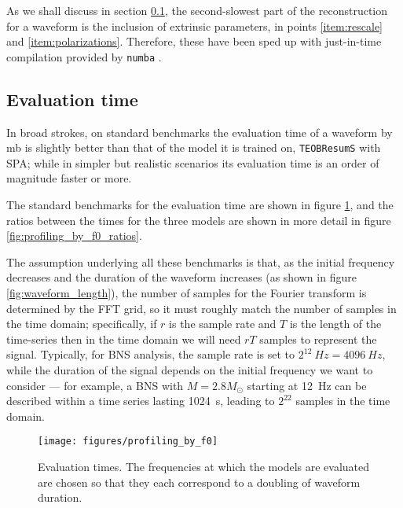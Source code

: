 \documentclass[main.tex]{subfiles}
\begin{document}
As we shall discuss in section \ref{sec:evaluation-time}, the second-slowest part of the reconstruction for a waveform is the inclusion of extrinsic parameters, in points \ref{item:rescale} and \ref{item:polarizations}. 
Therefore, these have been sped up with just-in-time compilation provided by \texttt{numba} \cite{lamNumbaLLVMbasedPython2015}.

\subsection{Evaluation time} \label{sec:evaluation-time}

In broad strokes, on standard benchmarks the evaluation time of a waveform by \ac{mb} is slightly better than that of the model it is trained on, \texttt{TEOBResumS} with \ac{SPA}; while in simpler but realistic scenarios its evaluation time is an order of magnitude faster or more.

The standard benchmarks for the evaluation time are shown in figure \ref{fig:profiling_by_f0}, and the ratios between the times for the three models are shown in more detail in figure \ref{fig:profiling_by_f0_ratios}. 

The assumption underlying all these benchmarks is that, as the initial frequency decreases and the duration of the waveform increases (as shown in figure \ref{fig:waveform_length}), the number of samples for the Fourier transform is determined by the \ac{FFT} grid, so it must roughly match the number of samples in the time domain; specifically, if \(r\) is the sample rate and \(T\) is the length of the time-series then in the time domain we will need \(rT\) samples to represent the signal. 
Typically, for \ac{BNS} analysis, the sample rate is set to \(2^{12} \SI{}{Hz} = \SI{4096}{Hz}\), while the duration of the signal depends on the initial frequency we want to consider --- for example, a \ac{BNS} with \(M = 2.8 M_{\odot}\) starting at \SI{12}{Hz} can be described within a time series lasting \SI{1024}{s}, leading to \(2^{22}\) samples in the time domain.


\begin{figure}[ht]
\centering
\texttt{[image: figures/profiling\_by\_f0]}
\caption{Evaluation times. The frequencies at which the models are evaluated are chosen so that they each correspond to a doubling of waveform duration.}
\label{fig:profiling_by_f0}
\end{figure}
\end{document}
